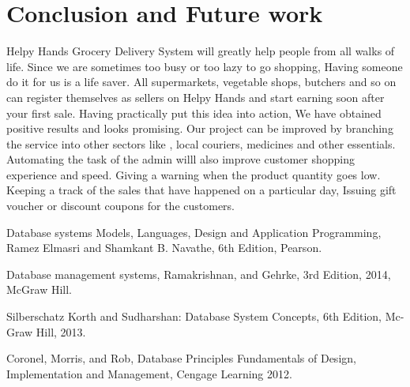 \documentclass[12pt,a4paper]{report}
\begin{document}
\chapter{Conclusion and Future work}
\noindent
Helpy Hands Grocery Delivery System will greatly help people from all walks of life. Since we are sometimes too busy or too lazy to go shopping, Having someone do it for us is a life saver.
All supermarkets, vegetable shops, butchers and so on can register themselves as sellers on Helpy Hands and start earning soon after your first sale. Having practically put this idea into action,
We have obtained positive results and looks promising. 
\noindent
Our project can be improved by branching the service into other sectors like , local couriers, medicines and other essentials. Automating the task of the admin willl also improve customer shopping experience
and speed.
Giving a warning when
the product quantity goes low. Keeping a track of the sales that have happened on a particular day,
Issuing gift voucher or discount coupons for the customers.
\newpage
\pagestyle{plain}
\renewcommand{\bibname}{References}

\begin{thebibliography}{35}
Database systems Models, Languages, Design and Application Programming, Ramez Elmasri and Shamkant B. Navathe, 6th Edition, Pearson.

Database management systems, Ramakrishnan, and Gehrke, 3rd Edition, 2014, McGraw Hill.

Silberschatz Korth and Sudharshan: Database System Concepts, 6th Edition, Mc-Graw Hill, 2013.

Coronel, Morris, and Rob, Database Principles Fundamentals of Design, Implementation and  
Management, Cengage Learning 2012.

\end{thebibliography}
\end{document}
